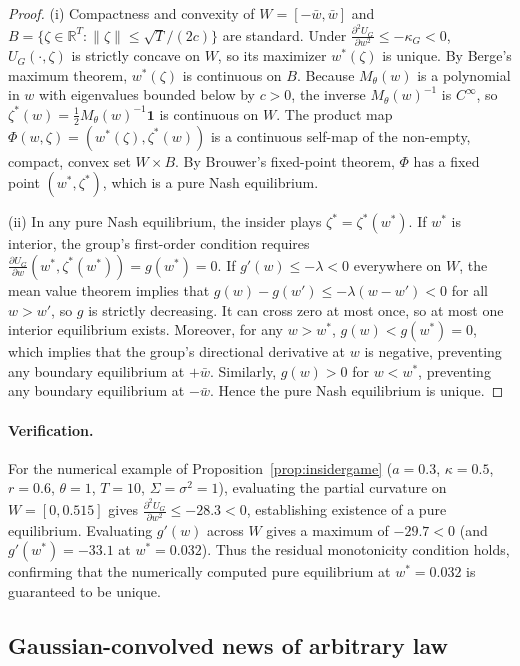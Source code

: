 \documentclass[12pt]{article}
\theoremstyle{definition}
\theoremstyle{remark}
\begin{document}
\begin{proof}
(i) Compactness and convexity of $W=[-\bar w,\bar w]$ and $B=\{\zeta\in\mathbb R^T:\|\zeta\|\le\sqrt T/(2c)\}$ are standard. Under $\frac{\partial^2 U_G}{\partial w^2}\le-\kappa_G<0$, $U_G(\cdot,\zeta)$ is strictly concave on $W$, so its maximizer $w^*(\zeta)$ is unique. By Berge's maximum theorem, $w^*(\zeta)$ is continuous on $B$. Because $M_\theta(w)$ is a polynomial in $w$ with eigenvalues bounded below by $c>0$, the inverse $M_\theta(w)^{-1}$ is $C^\infty$, so $\zeta^*(w)=\frac12 M_\theta(w)^{-1}\mathbf 1$ is continuous on $W$. The product map $\Phi(w,\zeta)=(w^*(\zeta),\zeta^*(w))$ is a continuous self-map of the non-empty, compact, convex set $W\times B$. By Brouwer's fixed-point theorem, $\Phi$ has a fixed point $(w^*,\zeta^*)$, which is a pure Nash equilibrium.

(ii) In any pure Nash equilibrium, the insider plays $\zeta^*=\zeta^*(w^*)$. If $w^*$ is interior, the group's first-order condition requires $\frac{\partial U_G}{\partial w}(w^*,\zeta^*(w^*))=g(w^*)=0$. If $g'(w)\le-\lambda<0$ everywhere on $W$, the mean value theorem implies that $g(w)-g(w')\le-\lambda(w-w')<0$ for all $w>w'$, so $g$ is strictly decreasing. It can cross zero at most once, so at most one interior equilibrium exists. Moreover, for any $w>w^*$, $g(w)<g(w^*)=0$, which implies that the group's directional derivative at $w$ is negative, preventing any boundary equilibrium at $+\bar w$. Similarly, $g(w)>0$ for $w<w^*$, preventing any boundary equilibrium at $-\bar w$. Hence the pure Nash equilibrium is unique.
\end{proof}

\paragraph{Verification.} For the numerical example of Proposition~\ref{prop:insidergame} ($a=0.3$, $\kappa=0.5$, $r=0.6$, $\theta=1$, $T=10$, $\Sigma=\sigma^2=1$), evaluating the partial curvature on $W=[0,0.515]$ gives $\frac{\partial^2 U_G}{\partial w^2}\le-28.3<0$, establishing existence of a pure equilibrium. Evaluating $g'(w)$ across $W$ gives a maximum of $-29.7<0$ (and $g'(w^*)=-33.1$ at $w^*=0.032$). Thus the residual monotonicity condition holds, confirming that the numerically computed pure equilibrium at $w^*=0.032$ is guaranteed to be unique.

\subsection{Gaussian-convolved news of arbitrary law}\label{app:convolvednews}\label{app:convexdealer}
\end{document}
